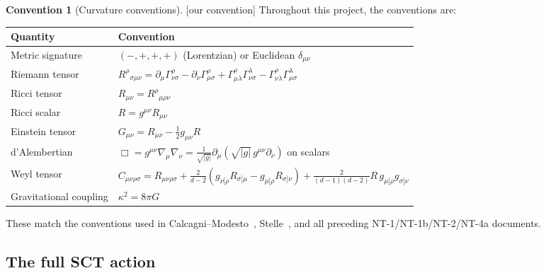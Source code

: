 \documentclass[12pt,a4paper]{article}
\theoremstyle{definition}
\newtheorem{convention}[proposition]{Convention}
\theoremstyle{remark}
\newcommand{\oursign}{\textcolor{teal!80!black}{\textsf{[our convention]}}}
\begin{document}
\begin{convention}[Curvature conventions]
\label{conv:curvature}
\oursign\;
Throughout this project, the conventions are:
\begin{center}
\renewcommand{\arraystretch}{1.3}
\begin{tabular}{ll}
\toprule
\textbf{Quantity} & \textbf{Convention} \\
\midrule
Metric signature & $(-,+,+,+)$ (Lorentzian) or Euclidean $\delta_{\mu\nu}$ \\
Riemann tensor & $R^\rho{}_{\sigma\mu\nu}
  = \partial_\mu\Gamma^\rho_{\nu\sigma}
  - \partial_\nu\Gamma^\rho_{\mu\sigma}
  + \Gamma^\rho_{\mu\lambda}\Gamma^\lambda_{\nu\sigma}
  - \Gamma^\rho_{\nu\lambda}\Gamma^\lambda_{\mu\sigma}$ \\
Ricci tensor & $R_{\mu\nu} = R^\rho{}_{\mu\rho\nu}$ \\
Ricci scalar & $R = g^{\mu\nu}R_{\mu\nu}$ \\
Einstein tensor & $G_{\mu\nu} = R_{\mu\nu} - \frac{1}{2}g_{\mu\nu}R$ \\
d'Alembertian & $\Box = g^{\mu\nu}\nabla_\mu\nabla_\nu
  = \frac{1}{\sqrt{|g|}}\partial_\mu(\sqrt{|g|}\,g^{\mu\nu}\partial_\nu)$
  on scalars \\
Weyl tensor & $C_{\mu\nu\rho\sigma} = R_{\mu\nu\rho\sigma}
  + \frac{2}{d-2}(g_{\nu[\rho}R_{\sigma]\mu} - g_{\mu[\rho}R_{\sigma]\nu})
  + \frac{2}{(d-1)(d-2)}R\,g_{\mu[\rho}g_{\sigma]\nu}$ \\
Gravitational coupling & $\kappa^2 = 8\pi G$ \\
\bottomrule
\end{tabular}
\end{center}
These match the conventions used in
Calcagni--Modesto~\cite{CalcagniModesto2022},
Stelle~\cite{Stelle1977,Stelle1978}, and all preceding
NT-1/NT-1b/NT-2/NT-4a documents.
\end{convention}


\subsection{The full SCT action}
\end{document}
